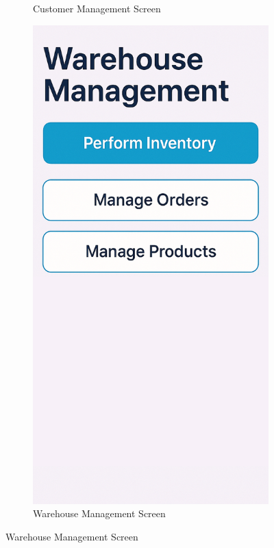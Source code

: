 \documentclass[12pt,a4paper,twoside]{book}
\begin{document}
\begin{figure}[H]
\begin{subfigure}[b]{0.48\textwidth}
        \caption{Customer Management Screen}\label{fig:mockup3}
    \end{subfigure}
    \hfill
    \begin{subfigure}[b]{0.48\textwidth}
        \centering
        \includegraphics[width=\textwidth,height=0.4\textheight,keepaspectratio]{Resources/Mockup Screens/warehouse_management_products.png}
        \caption{Warehouse Management Screen}\label{fig:mockup4}
    \end{subfigure}
\end{figure}
\end{document}
